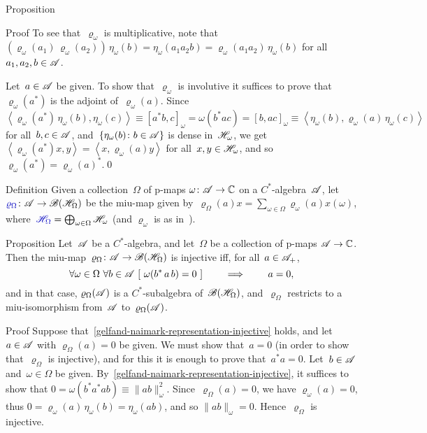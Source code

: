 \documentclass[a]{subfiles}
\begin{document}
\begin{parsec}
\begin{point}{Proposition}
\begin{point}{Proof}
To see that~$\varrho_\omega$ is multiplicative,
note that
$(\varrho_\omega(a_1)\,\varrho_\omega(a_2))\,\eta_\omega(b)
= \eta_\omega(a_1a_2b)=\varrho_\omega(a_1a_2)\,\eta_\omega(b)$
for all~$a_1,a_2,b\in\mathscr{A}$.

Let~$a\in\mathscr{A}$ be given.
To show that~$\varrho_\omega$ is involutive
it suffices to prove that~$\varrho_\omega(a^*)$
is the adjoint of~$\varrho_\omega(a)$.
Since~$\left<\varrho_\omega(a^*)\,\eta_\omega(b),\eta_\omega(c)\right>
\equiv [a^*b,c]_\omega = \omega(b^*ac)=[b,ac]_\omega
\equiv \left<\eta_\omega(b),\varrho_\omega(a)\,\eta_\omega(c)\right>$
for all~$b,c\in\mathscr{A}$,
and~$\{\eta_\omega(b)\colon b\in\mathscr{A}\}$
is dense in~$\mathscr{H}_\omega$,
we get~$\left<\varrho_\omega(a^*)x,y\right>=\left<x,\varrho_\omega(a)y\right>$
for all~$x,y\in\mathscr{H}_\omega$,
and so~$\varrho_\omega(a^*)=\varrho_\omega(a)^*$.\qed
\end{point}
\end{point}
\begin{point}{Definition}%
Given a collection~$\Omega$ of p-maps $\omega\colon \mathscr{A}\to\mathbb{C}$
on a $C^*$-algebra~$\mathscr{A}$,
let $\Define{\varrho_\Omega}\colon \scrA\to \scrB(\scrH_\Omega)$
be the miu-map given by~$\varrho_\Omega(a)x 
= \sum_{\omega\in\Omega} \varrho_\omega(a)x(\omega)$,
where~$\Define{\scrH_\Omega}=\bigoplus_{\omega\in\Omega}\scrH_\omega$
(and $\varrho_\omega$ is as in~).
\end{point}
\begin{point}{Proposition}%
Let~$\mathscr{A}$ be a $C^*$-algebra,
and let~$\Omega$ be a collection of p-maps
$\mathscr{A}\to\mathbb{C}$.
Then the miu-map~$\varrho_\Omega\colon \mathscr{A}\to\mathscr{B}(\mathscr{H}_\Omega)$
is injective iff, for all~$a\in \mathscr{A}_{+}$,
\begin{equation}
	\label{gelfand-naimark-representation-injective}
	\forall \omega\in \Omega\ 
	\forall b\in\scrA \ 
	[\ 
	\omega(b^*\,a\,b)=0\ ]
\qquad\implies\qquad
a=0,
\end{equation}
and in that case, $\varrho_\Omega(\mathscr{A})$ is a $C^*$-subalgebra
of~$\mathscr{B}(\mathscr{H}_\Omega)$,
and~$\varrho_\Omega$
restricts to a miu-isomorphism from~$\mathscr{A}$ to~$\varrho_\Omega(\mathscr{A})$.
\begin{point}{Proof}%
Suppose that~\eqref{gelfand-naimark-representation-injective}
holds, and let~$a\in \mathscr{A}$ with $\varrho_\Omega(a)=0$ be given.
We must show that~$a=0$ (in order to show that~$\varrho_\Omega$
is injective),
and for this it is enough to prove that~$a^*a=0$.
Let~$b\in\mathscr{A}$ and~$\omega\in\Omega$ be given.
By~\ref{gelfand-naimark-representation-injective},
it suffices to show that $0=\omega(b^*a^*ab) \equiv \|ab\|_\omega^2$.
Since~$\varrho_\Omega(a)=0$,
we have $\varrho_\omega(a)=0$,
thus $0=\varrho_\omega(a)\,\eta_\omega(b)
=\eta_\omega(ab)$,
and so $\|ab\|_\omega=0$.
Hence~$\varrho_\Omega$ is injective.


\end{point}
\end{point}
\end{parsec}
\end{document}
